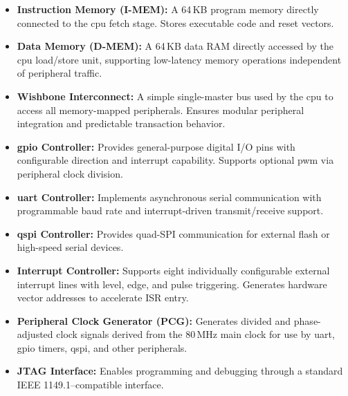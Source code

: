 \begin{itemize}
\begin{itemize}
                  \item \textbf{Instruction Memory (\gls{I-MEM}):}
                        A 64\,KB program memory directly connected to the \gls{cpu} fetch stage. Stores executable code and
                        reset vectors.

                  \item \textbf{Data Memory (\gls{D-MEM}):}
                        A 64\,KB data RAM directly accessed by the \gls{cpu} load/store unit, supporting low-latency memory
                        operations independent of peripheral traffic.

                  \item \textbf{Wishbone Interconnect:}
                        A simple single-master bus used by the \gls{cpu} to access all memory-mapped peripherals. Ensures
                        modular peripheral integration and predictable transaction behavior.

                  \item \textbf{\gls{gpio} Controller:}
                        Provides general-purpose digital I/O pins with configurable direction and interrupt capability.
                        Supports optional \gls{pwm} via peripheral clock division.

                  \item \textbf{\gls{uart} Controller:}
                        Implements asynchronous serial communication with programmable baud rate and interrupt-driven
                        transmit/receive support.

                  \item \textbf{\gls{qspi} Controller:}
                        Provides quad-SPI communication for external flash or high-speed serial devices.

                  \item \textbf{Interrupt Controller:}
                        Supports eight individually configurable external interrupt lines with level, edge, and pulse
                        triggering. Generates hardware vector addresses to accelerate ISR entry.

                  \item \textbf{Peripheral Clock Generator (PCG):}
                        Generates divided and phase-adjusted clock signals derived from the 80\,MHz main clock for use
                        by \gls{uart}, \gls{gpio} timers, \gls{qspi}, and other peripherals.

                  \item \textbf{JTAG Interface:}
                        Enables programming and debugging through a standard IEEE 1149.1–compatible interface.
            \end{itemize}


\end{itemize}
